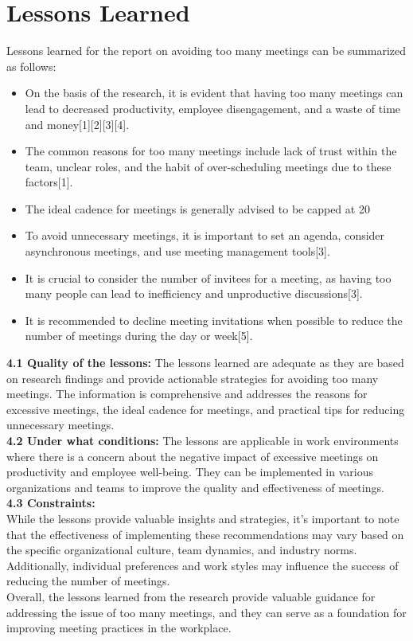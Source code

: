 \documentclass[runningheads]{llncs}
\begin{document}
\section{Lessons Learned}
Lessons learned for the report on avoiding too many meetings can be summarized as follows:
\begin{itemize}
\item On the basis of the research, it is evident that having too many meetings can lead to decreased productivity, employee disengagement, and a waste of time and money[1][2][3][4].
\item The common reasons for too many meetings include lack of trust within the team, unclear roles, and the habit of over-scheduling meetings due to these factors[1].
\item The ideal cadence for meetings is generally advised to be capped at 20%
\item To avoid unnecessary meetings, it is important to set an agenda, consider asynchronous meetings, and use meeting management tools[3].
\item It is crucial to consider the number of invitees for a meeting, as having too many people can lead to inefficiency and unproductive discussions[3].
\item It is recommended to decline meeting invitations when possible to reduce the number of meetings during the day or week[5].
\end{itemize}

{\bf 4.1 Quality of the lessons:}
The lessons learned are adequate as they are based on research findings and provide actionable strategies for avoiding too many meetings. The information is comprehensive and addresses the reasons for excessive meetings, the ideal cadence for meetings, and practical tips for reducing unnecessary meetings.\\

{\bf 4.2 Under what conditions:}
The lessons are applicable in work environments where there is a concern about the negative impact of excessive meetings on productivity and employee well-being. They can be implemented in various organizations and teams to improve the quality and effectiveness of meetings.\\

{\bf 4.3 Constraints:}\\
While the lessons provide valuable insights and strategies, it's important to note that the effectiveness of implementing these recommendations may vary based on the specific organizational culture, team dynamics, and industry norms. Additionally, individual preferences and work styles may influence the success of reducing the number of meetings.\\
Overall, the lessons learned from the research provide valuable guidance for addressing the issue of too many meetings, and they can serve as a foundation for improving meeting practices in the workplace.
\end{document}
